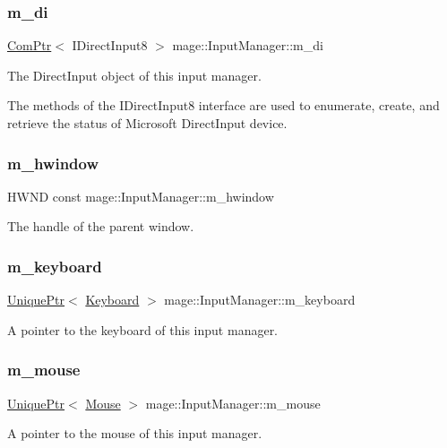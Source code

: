 \subsubsection{\texorpdfstring{m\+\_\+di}{m\_di}}
{\footnotesize\ttfamily \hyperlink{namespacemage_ae74f374780900893caa5555d1031fd79}{Com\+Ptr}$<$ I\+Direct\+Input8 $>$ mage\+::\+Input\+Manager\+::m\+\_\+di\hspace{0.3cm}{\ttfamily [private]}}

The Direct\+Input object of this input manager.

The methods of the I\+Direct\+Input8 interface are used to enumerate, create, and retrieve the status of Microsoft Direct\+Input device. \hypertarget{classmage_1_1_input_manager_add8e8743b27a9c94caa1d793b31b0638}{}\label{classmage_1_1_input_manager_add8e8743b27a9c94caa1d793b31b0638} 
\subsubsection{\texorpdfstring{m\+\_\+hwindow}{m\_hwindow}}
{\footnotesize\ttfamily H\+W\+ND const mage\+::\+Input\+Manager\+::m\+\_\+hwindow\hspace{0.3cm}{\ttfamily [private]}}

The handle of the parent window. \hypertarget{classmage_1_1_input_manager_a196bdd04e169e89d0fa5f6a4a180e4cb}{}\label{classmage_1_1_input_manager_a196bdd04e169e89d0fa5f6a4a180e4cb} 
\subsubsection{\texorpdfstring{m\+\_\+keyboard}{m\_keyboard}}
{\footnotesize\ttfamily \hyperlink{namespacemage_a8c307fbcc33bce9b7f2aa4c26c3b95cf}{Unique\+Ptr}$<$ \hyperlink{classmage_1_1_keyboard}{Keyboard} $>$ mage\+::\+Input\+Manager\+::m\+\_\+keyboard\hspace{0.3cm}{\ttfamily [private]}}

A pointer to the keyboard of this input manager. \hypertarget{classmage_1_1_input_manager_aab9773cccf9626a7e2acb99227b42e37}{}\label{classmage_1_1_input_manager_aab9773cccf9626a7e2acb99227b42e37} 
\subsubsection{\texorpdfstring{m\+\_\+mouse}{m\_mouse}}
{\footnotesize\ttfamily \hyperlink{namespacemage_a8c307fbcc33bce9b7f2aa4c26c3b95cf}{Unique\+Ptr}$<$ \hyperlink{classmage_1_1_mouse}{Mouse} $>$ mage\+::\+Input\+Manager\+::m\+\_\+mouse\hspace{0.3cm}{\ttfamily [private]}}

A pointer to the mouse of this input manager. 